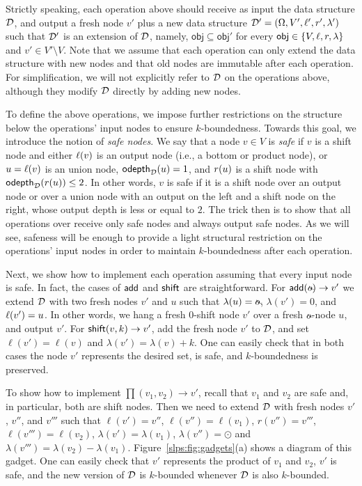Strictly speaking, each operation above should receive as input the data structure $\mathcal{D}$, and output a fresh node $v'$ plus a new data structure $\mathcal{D}' = (\Omega, V', \ell', r', \lambda')$ such that $\mathcal{D}'$ is an extension of $\mathcal{D}$, namely, $\mathsf{obj} \subseteq \mathsf{obj}'$ for every $\mathsf{obj} \in \{V, \ell, r, \lambda\}$ and $v' \in V' \setminus V$. Note that we assume that each operation can only extend the data structure with new nodes and that old nodes are immutable after each operation. For simplification, we will not explicitly refer to $\mathcal{D}$ on the operations above, although they modify $\mathcal{D}$ directly by adding new nodes. 

To define the above operations, we impose further restrictions on the structure below the operations' input nodes to ensure $k$-boundedness. Towards this goal, we introduce the notion of \emph{safe nodes}.
We say that a node $v \in V$ is \emph{safe} if $v$ is a shift node and either $\ell(v)$ is an output node (i.e., a bottom or product node), or $u = \ell(v)$ is an union node,  $\mathsf{odepth}_{\mathcal{D}}(u) = 1$, and $r(u)$ is a shift node with $\mathsf{odepth}_{\mathcal{D}}(r(u)) \leq 2$.
In other words, $v$ is safe if it is a shift node over an output node or over a union node with an output on the left and a shift node on the right, whose output depth is less or equal to $2$. 
The trick then is to show that all operations over \dsabbrs{} receive only safe nodes and always output safe nodes. 
As we will see, safeness will be enough to provide a light structural restriction on the operations' input nodes in order to maintain $k$-boundedness after each operation.  

Next, we show how to implement each operation assuming that every input node is safe. In fact, the cases of $\mathsf{add}$ and $\mathsf{shift}$ are straightforward. 
For $\add(\oout)\to v'$ we extend $\mathcal{D}$ with two fresh nodes $v'$ and $u$ such that $\lambda(u) = \oout$, $\lambda(v') = 0$, and $\ell(v') = u$. In other words, we hang a fresh $0$-shift node $v'$ over a fresh $\oout$-node $u$, and output $v'$. 
For $\mathsf{shift}(v, k) \to v'$, add the fresh node $v'$ to $\mathcal{D}$, and set $\ell(v') = \ell(v)$ and $\lambda(v') = \lambda(v) + k$.
One can easily check that in both cases the node $v'$ represents the desired set, is safe, and $k$-boundedness is preserved.

To show how to implement $\prod(v_1, v_2)\to v'$, recall that $v_1$ and $v_2$ are safe and, in particular, both are shift nodes. 
Then we need to extend $\mathcal{D}$ with fresh nodes $v'$, $v''$, and $v'''$ such that  $\ell(v') = v''$, $\ell(v'') = \ell(v_1)$, $r(v'') = v'''$, $\ell(v''') = \ell(v_2)$, $\lambda(v') = \lambda(v_1)$, $\lambda(v'') = \odot$ and $\lambda(v''') = \lambda(v_2) - \lambda(v_1)$. 
Figure~\ref{slps:fig:gadgets}(a) shows a diagram of this gadget. One can easily check that $v'$ represents the product of $v_1$ and $v_2$, $v'$ is safe, and the new version of $\mathcal{D}$ is $k$-bounded whenever $\mathcal{D}$ is also $k$-bounded.

